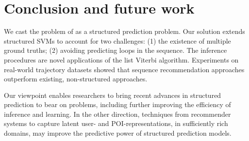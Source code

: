 
\section{Conclusion and future work}

We cast the problem of {\trajrec}
as a structured prediction problem.
Our solution extends structured SVMs to account for two challenges:
(1) the existence of multiple ground truths;
(2) avoiding predicting loops in the sequence.
The inference procedures are novel applications of the list Viterbi algorithm.
Experiments on real-world trajectory datasets showed that
sequence recommendation approaches outperform existing, non-structured approaches.

Our viewpoint enables researchers to bring recent advances in structured prediction
to bear on {\trajrec} problems,
including further improving the efficiency of inference and learning.
In the other direction, techniques from recommender systems to capture latent
user- and POI-representations, in sufficiently rich domains, may
improve the predictive power of structured prediction models.

